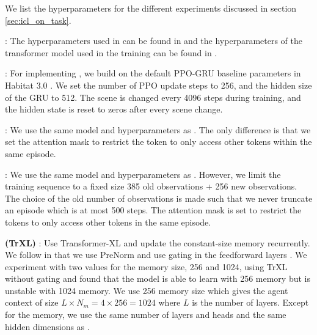 We list the hyperparameters for the different experiments discussed in section \cref{sec:icl_on_task}.

\textbf{{\method}}: The hyperparameters used in \method can be found in  and the hyperparameters of the transformer model used in the training can be found in . 

\textbf{\rls}: For implementing \rls, we build on the default PPO-GRU baseline parameters in Habitat 3.0 \cite{puig2023habitat3}. We set the number of PPO update steps to 256, and the hidden size of the GRU to 512. The scene is changed every 4096 steps during training, and the hidden state is reset to zeros after every scene change.

\textbf{\ieafmethod}: We use the same model and hyperparameters as \method. The only difference is that we set the attention mask to restrict the token to only access other tokens within the same episode.

\textbf{\semethod}: We use the same model and hyperparameters as \method. However, we limit the training sequence to a fixed size 385 old observations + 256 new observations. The choice of the old number of observations is made such that we never truncate an episode which is at most 500 steps. The attention mask is set to restrict the tokens to only access other tokens in the same episode.

\textbf{\trxl (TrXL)} \cite{dai2019transformerxl}: Use Transformer-XL and update the constant-size memory recurrently. We follow \cite{team2023human} in that we use PreNorm \cite{gtrxl} and use gating in the feedforward layers \cite{shazeer2020glu}. We experiment with two values for the memory size, 256 and 1024, using TrXL without gating and found that the model is able to learn with 256 memory but is unstable with 1024 memory. We use 256 memory size which gives the agent context of size $L \times N_m=4\times 256=1024$ where $L$ is the number of layers. Except for the memory, we use the same number of layers and heads and the same hidden dimensions as \method.

